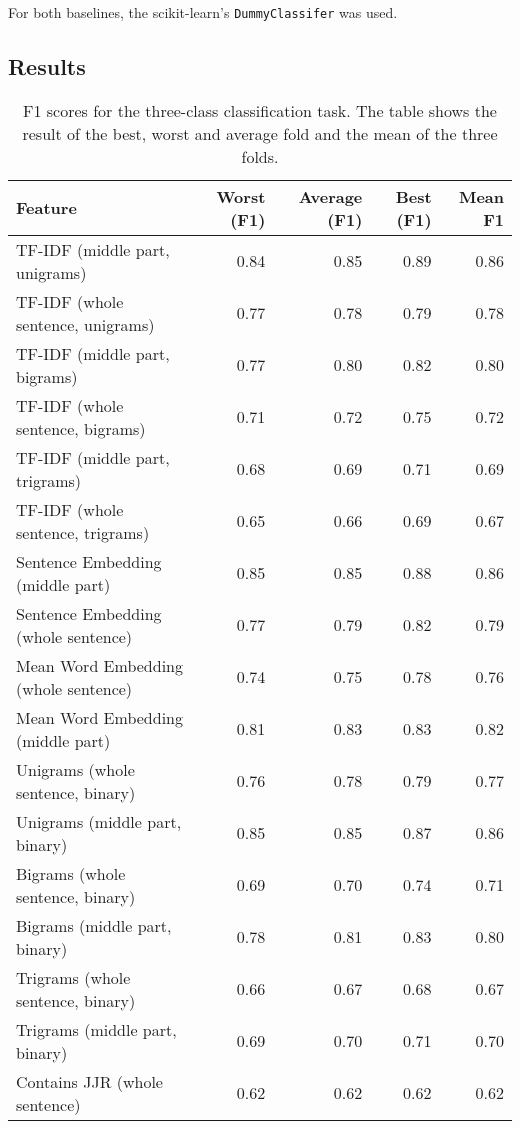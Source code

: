 For both baselines, the scikit-learn's \texttt{DummyClassifer} was used.
\subsection{Results}

\begin{table}[h]
\centering
\caption{F1 scores for the three-class classification task. The table shows the result of the best, worst and average fold and the mean of the three folds.}
\label{my-label}
\begin{tabularx}{\textwidth}{Xrrrr}
\toprule
Feature & Worst (F1) & Average (F1) & Best (F1) & Mean F1 \\ \midrule

TF-IDF (middle part, unigrams) &         0.84 &  0.85&   0.89&  0.86 \\ 
TF-IDF (whole sentence, unigrams) &      0.77 &  0.78&   0.79&  0.78 \\ 
TF-IDF (middle part, bigrams) &  0.77 &  0.80&   0.82&  0.80 \\ 
TF-IDF (whole sentence, bigrams) &       0.71 &  0.72&   0.75&  0.72 \\ 
TF-IDF (middle part, trigrams) &         0.68 &  0.69&   0.71&  0.69 \\ 
TF-IDF (whole sentence, trigrams) &      0.65 &  0.66&   0.69&  0.67 \\ 
Sentence Embedding (middle part) &       0.85 &  0.85&   0.88&  0.86 \\ 
Sentence Embedding (whole sentence) &    0.77 &  0.79&   0.82&  0.79 \\ 
Mean Word Embedding (whole sentence) &   0.74 &  0.75&   0.78&  0.76 \\ 
Mean Word Embedding (middle part) &      0.81 &  0.83&   0.83&  0.82 \\ 
Unigrams (whole sentence, binary) &      0.76 &  0.78&   0.79&  0.77 \\ 
Unigrams (middle part, binary) &         0.85 &  0.85&   0.87&  0.86 \\ 
Bigrams (whole sentence, binary) &       0.69 &  0.70&   0.74&  0.71 \\ 
Bigrams (middle part, binary) &  0.78 &  0.81&   0.83&  0.80 \\ 
Trigrams (whole sentence, binary) &      0.66 &  0.67&   0.68&  0.67 \\ 
Trigrams (middle part, binary) &         0.69 &  0.70&   0.71&  0.70 \\ 
Contains JJR (whole sentence) &  0.62 &  0.62&   0.62&  0.62 \\ 

\end{tabularx}
\end{table}
